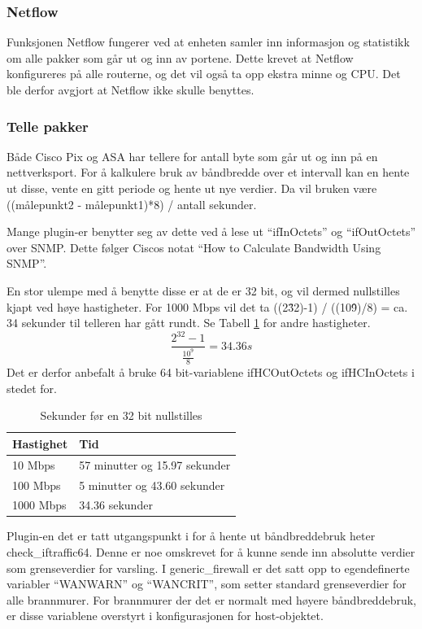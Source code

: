 \subsubsection*{Netflow}
Funksjonen Netflow\cite{ciscoiosnetflow} fungerer ved at enheten samler inn informasjon og statistikk om alle pakker som går ut og inn av portene. Dette krevet at Netflow konfigureres på alle routerne, og det vil også ta opp ekstra minne og CPU\cite{cisconetflowperf}. Det ble derfor avgjort at Netflow ikke skulle benyttes.

\subsubsection*{Telle pakker}
Både Cisco Pix og ASA har tellere for antall byte som går ut og inn på en nettverksport. For å kalkulere bruk av båndbredde over et intervall kan en hente ut disse, vente en gitt periode og hente ut nye verdier. Da vil bruken være ((målepunkt2 - målepunkt1)*8) / antall sekunder.

Mange plugin-er benytter seg av dette ved å lese ut ``ifInOctets'' og ``ifOutOctets'' over SNMP. Dette følger Ciscos notat ``How to Calculate Bandwidth Using SNMP''\cite{ciscobandwidth}. 

En stor ulempe med å benytte disse er at de er 32 bit, og vil dermed nullstilles kjapt ved høye hastigheter. For 1000 Mbps vil det ta ((2\^32)-1) / ((10\^9)/8) = ca. 34 sekunder til telleren har gått rundt. Se Tabell \ref{kalkulering_teller} for andre hastigheter.
\begin{equation}
\frac{2^{32}-1}{\frac{10^9}{8}}=34.36 s
\end{equation}
Det er derfor anbefalt å bruke 64 bit-variablene ifHCOutOctets og ifHCInOctets i stedet for\cite{ciscosnmpcounters}.
\begin{table}
\begin{center}
\begin{tabular}{ | l | p{7cm} |} \hline
    \textbf{Hastighet} & \textbf{Tid} \\ \hline
    10 Mbps & 57 minutter og 15.97 sekunder \\ \hline
    100 Mbps & 5 minutter og 43.60 sekunder \\ \hline
    1000 Mbps & 34.36 sekunder \\ \hline
\end{tabular}
\caption{Sekunder før en 32 bit nullstilles }
\label{kalkulering_teller}
\end{center}
\end{table}
Plugin-en det er tatt utgangspunkt i for å hente ut båndbreddebruk heter check\_iftraffic64\cite{checkciscoif}. Denne er noe omskrevet for å kunne sende inn absolutte verdier som grenseverdier for varsling. I generic\_firewall er det satt opp to egendefinerte variabler ``WANWARN'' og ``WANCRIT'', som setter standard grenseverdier for alle brannmurer. For brannmurer der det er normalt med høyere båndbreddebruk, er disse variablene overstyrt i konfigurasjonen for host-objektet.

